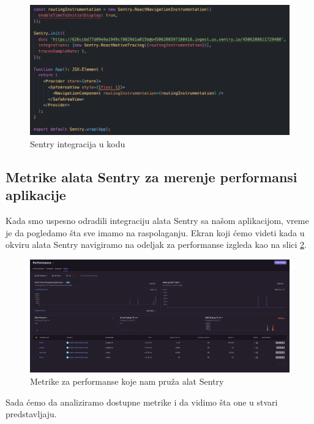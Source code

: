 \documentclass[12pt,oneside]{memoir}
\begin{document}
\begin{figure}[h]
    \centering
    \includegraphics[scale=0.5]{docs/images/chapterFive/sentryIntegration.png}
    \caption{Sentry integracija u kodu}
    \label{fig:sentryIntegration}
\end{figure}

\subsection{Metrike alata Sentry za merenje performansi aplikacije}

Kada smo uspesno odradili integraciju alata Sentry sa našom aplikacijom, vreme je da pogledamo šta sve imamo na raspolaganju. Ekran koji ćemo videti kada u okviru alata Sentry navigiramo na odeljak za performanse izgleda kao na slici \ref{fig:sentryMetrics}.

\begin{figure}[h]
    \centering
    \includegraphics[scale=0.2]{docs/images/chapterFive/sentryPerfMetrics.png}
    \caption{Metrike za performanse koje nam pruža alat Sentry}
    \label{fig:sentryMetrics}
\end{figure}

Sada ćemo da analiziramo dostupne metrike\cite{SentryPerfMetrics} i da vidimo šta one u stvari predstavljaju.
\end{document}
